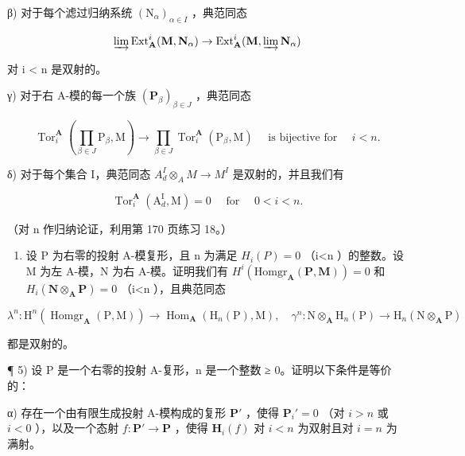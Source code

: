 β) 对于每个滤过归纳系统 \((\mathrm{N}_{\alpha})_{\alpha\in I}\) ，典范同态

\[
\varinjlim \operatorname{Ext} _ {\mathbf {A}} ^ {i} (\mathbf {M}, \mathbf {N} _ {\alpha}) \rightarrow \operatorname{Ext} _ {\mathbf {A}} ^ {i} (\mathbf {M}, \varinjlim \mathbf {N} _ {\alpha})
\]

对 i \textless{} n 是双射的。

γ) 对于右 A-模的每一个族 \((\mathbf{P}_{\beta})_{\beta \in J}\) ，典范同态

\[
\operatorname{Tor} _ {i} ^ {\mathbf {A}} \left(\prod_ {\beta \in J} \mathrm{P} _ {\beta}, \mathrm{M}\right)\rightarrow \prod_ {\beta \in J} \operatorname{Tor} _ {i} ^ {\mathbf {A}} \left(\mathrm{P} _ {\beta}, \mathrm{M}\right) \quad \text { is   bijective   for } \quad i <   n.
\]

δ) 对于每个集合 I，典范同态 \(A_{d}^{I} \otimes_{A} M \to M^{I}\) 是双射的，并且我们有

\[
\operatorname{Tor} _ {i} ^ {\mathbf {A}} \left(\mathrm{A} _ {d} ^ {\mathrm{I}}, \mathrm{M}\right) = 0 \quad \text { for } \quad 0 <   i <   n.
\]

（对 n 作归纳论证，利用第 170 页练习 18。）

\begin{enumerate}
\def\labelenumi{\arabic{enumi})}
\setcounter{enumi}{3}
\tightlist
\item
  设 P 为右零的投射 A-模复形，且 n 为满足 \(H_{i}(P)=0\) （i\textless n ）的整数。设 M 为左 A-模，N 为右 A-模。证明我们有 \(H^{i}(\mathrm{Homgr}_{\mathbf{A}}(\mathbf{P},\mathbf{M}))=0\) 和 \(H_{i}(\mathbf{N}\otimes_{\mathbf{A}}\mathbf{P})=0\) （i\textless n ），且典范同态
\end{enumerate}

\[
\lambda^ {n}: \mathrm{H} ^ {n} (\operatorname{Homgr} _ {\mathbf {A}} (\mathrm{P}, \mathrm{M})) \rightarrow \operatorname{Hom} _ {\mathbf {A}} \left(\mathrm{H} _ {n} (\mathrm{P}), \mathrm{M}\right), \quad \gamma^ {n}: \mathrm{N} \otimes_ {\mathbf {A}} \mathrm{H} _ {n} (\mathrm{P}) \rightarrow \mathrm{H} _ {n} (\mathrm{N} \otimes_ {\mathbf {A}} \mathrm{P})
\]

都是双射的。

¶ 5) 设 P 是一个右零的投射 A-复形，n 是一个整数 ≥ 0。证明以下条件是等价的：

α) 存在一个由有限生成投射 A-模构成的复形 \(\mathbf{P}'\) ，使得 \(\mathbf{P}_i' = 0\) （对 \(i > n\) 或 \(i < 0\) ），以及一个态射 \(f: \mathbf{P}' \to \mathbf{P}\) ，使得 \(\mathbf{H}_i(f)\) 对 \(i < n\) 为双射且对 \(i = n\) 为满射。


